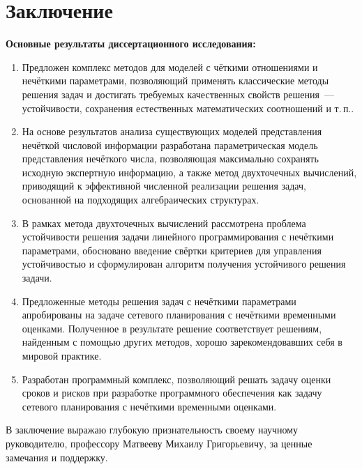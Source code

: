 \chapter*{Заключение}						%

\textbf{Основные результаты диссертационного исследования:}
\begin{enumerate}
  \item Предложен комплекс методов для моделей с чёткими отношениями и нечёткими параметрами, позволяющий применять классические методы решения задач и достигать требуемых качественных свойств решения~--- устойчивости, сохранения естественных математических соотношений и т.\,п..
  \item На основе результатов анализа существующих моделей представления нечёткой числовой информации разработана параметрическая модель представления нечёткого числа, позволяющая максимально сохранять исходную экспертную информацию, а также метод двухточечных вычислений, приводящий к эффективной численной реализации решения задач, основанной на подходящих алгебраических структурах.
  \item В рамках метода двухточечных вычислений рассмотрена проблема устойчивости решения задачи линейного программирования с нечёткими параметрами, обосновано введение свёртки критериев для управления устойчивостью и сформулирован алгоритм получения устойчивого решения задачи.
  \item Предложенные методы решения задач с нечёткими параметрами апробированы на задаче сетевого планирования с нечёткими временными оценками. Полученное в результате решение соответствует решениям, найденным с помощью других методов, хорошо зарекомендовавших себя в мировой практике.
  \item Разработан программный комплекс, позволяющий решать задачу оценки сроков и рисков при разработке программного обеспечения как задачу сетевого планирования с нечёткими временными оценками.
\end{enumerate}

В заключение выражаю глубокую признательность своему научному руководителю, профессору Матвееву Михаилу Григорьевичу, за ценные замечания и поддержку.
\clearpage